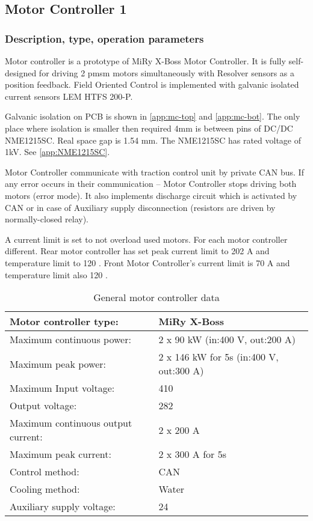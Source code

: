 \subsection{Motor Controller 1}

\subsubsection{Description, type, operation parameters}
Motor controller is a prototype of MiRy X-Boss Motor Controller. It is fully self-designed for driving 2 \gls{pmsm} motors simultaneously with Resolver sensors as a position feedback. Field Oriented Control is implemented with galvanic isolated current sensors LEM HTFS 200-P.

Galvanic isolation on PCB is shown in \ref{app:mc-top} and \ref{app:mc-bot}. The only place where isolation is smaller then required 4mm is between pins of DC/DC NME1215SC. Real space gap is 1.54 mm. The NME1215SC has rated voltage of 1kV. See \ref{app:NME1215SC}.

Motor Controller communicate with traction control unit by private CAN bus. If any error occurs in their communication – Motor Controller stops driving both motors (error mode). It also implements discharge circuit which is activated by CAN or in case of Auxiliary supply disconnection (resistors are driven by normally-closed relay).

A current limit is set to not overload used motors. For each motor controller different. Rear motor controller has set peak current limit to 202 A and temperature limit to 120 \degC. Front Motor Controller’s current limit is 70 A and temperature limit also 120 \degC.

\begin{table}[H]
	\centering
	\caption{General motor controller data}
	\begin{tabu}{|X|X|}\hline
		Motor controller type: & MiRy X-Boss \\\hline
		Maximum continuous power: & 2 x 90 kW (in:400 V, out:200 A) \\\hline
		Maximum peak power: & 2 x 146 kW for 5s (in:400 V, out:300 A) \\\hline
		Maximum Input voltage: & 410 \vdc \\\hline
		Output voltage: & 282 \vac \\\hline
		Maximum continuous output current: & 2 x 200 A \\\hline
		Maximum peak current: & 2 x 300 A for 5s \\\hline
		Control method: & CAN \\\hline
		Cooling method: & Water \\\hline
		Auxiliary supply voltage: & 24 \vdc \\\hline
	\end{tabu}%
	\label{tab:MC:general}%
\end{table}%

